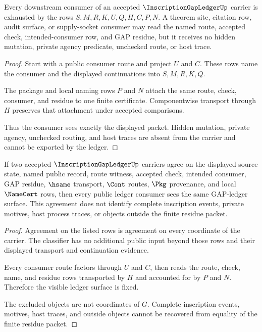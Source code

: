 \begin{theorem}
\label{thm:inscription-gap-ledger-consumer-exhaustion}
Every downstream consumer of an accepted $\InscriptionGapLedgerUp$ carrier is exhausted by the rows $S,M,R,K,U,Q,H,C,P,N$. A theorem site, citation row, audit surface, or supply-socket consumer may read the named route, accepted check, intended-consumer row, and GAP residue, but it receives no hidden mutation, private agency predicate, unchecked route, or host trace.
\end{theorem}
\begin{proof}
Start with a public consumer route and project $U$ and $C$. These rows name the consumer and the displayed continuations into $S,M,R,K,Q$.

The package and local naming rows $P$ and $N$ attach the same route, check, consumer, and residue to one finite certificate. Componentwise transport through $H$ preserves that attachment under accepted comparisons.

Thus the consumer sees exactly the displayed packet. Hidden mutation, private agency, unchecked routing, and host traces are absent from the carrier and cannot be exported by the ledger.
\end{proof}

\begin{theorem}
\label{thm:inscription-gap-ledger-nonescape}
If two accepted $\InscriptionGapLedgerUp$ carriers agree on the displayed source state, named public record, route witness, accepted check, intended consumer, GAP residue, $\hsame$ transport, $\Cont$ routes, $\Pkg$ provenance, and local $\NameCert$ rows, then every public ledger consumer sees the same GAP-ledger surface. This agreement does not identify complete inscription events, private motives, host process traces, or objects outside the finite residue packet.
\end{theorem}
\begin{proof}
Agreement on the listed rows is agreement on every coordinate of the carrier. The classifier has no additional public input beyond those rows and their displayed transport and continuation evidence.

Every consumer route factors through $U$ and $C$, then reads the route, check, name, and residue rows transported by $H$ and accounted for by $P$ and $N$. Therefore the visible ledger surface is fixed.

The excluded objects are not coordinates of $G$. Complete inscription events, motives, host traces, and outside objects cannot be recovered from equality of the finite residue packet.
\end{proof}


